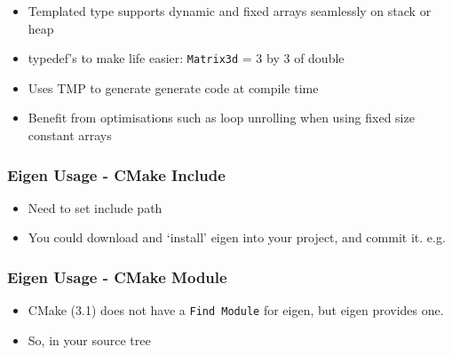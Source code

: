 \begin{itemize}
\itemsep1pt\parskip0pt
\item
  Templated type supports dynamic and fixed arrays seamlessly on stack
  or heap
\item
  typedef's to make life easier: \texttt{Matrix3d} = 3 by 3 of double
\item
  Uses TMP to generate generate code at compile time
\item
  Benefit from optimisations such as loop unrolling when using fixed
  size constant arrays
\end{itemize}

\subsubsection{Eigen Usage - CMake
Include}\label{eigen-usage---cmake-include}

\begin{itemize}
\itemsep1pt\parskip0pt
\item
  Need to set include path
\item
  You could download and `install' eigen into your project, and commit
  it. e.g.
\end{itemize}

\begin{Shaded}
\begin{Highlighting}[]
\NormalTok{(}
\end{Highlighting}
\end{Shaded}

\subsubsection{Eigen Usage - CMake
Module}\label{eigen-usage---cmake-module}

\begin{itemize}
\itemsep1pt\parskip0pt
\item
  CMake (3.1) does not have a \texttt{Find Module} for eigen, but eigen
  provides one.
\item
  So, in your source tree
\end{itemize}

\begin{Shaded}
\begin{Highlighting}[]
 
 \KeywordTok{<}\KeywordTok{>}
\end{Highlighting}
\end{Shaded}

